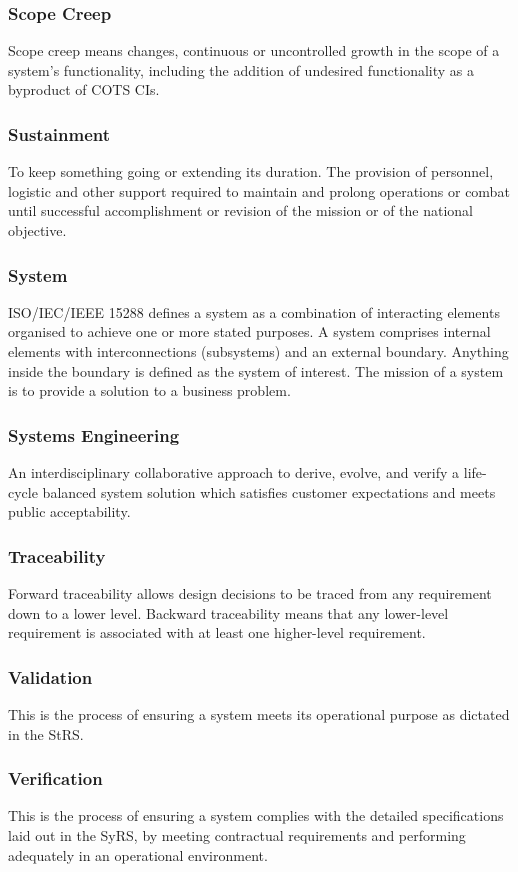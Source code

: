 \documentclass[journal]{IEEEtran}
\begin{document}
\subsubsection{Scope Creep}
Scope creep means changes, continuous or uncontrolled growth in the scope of a system's functionality, including the addition of undesired functionality as a byproduct of COTS CIs.
\subsubsection{Sustainment}
To keep something going or extending its duration. The provision of personnel, logistic and other support required to maintain and  prolong operations or combat until successful accomplishment or revision of the mission or of
the national objective.
\subsubsection{System}
ISO/IEC/IEEE 15288 defines a system as a combination of interacting elements organised to achieve one or more stated purposes. A system comprises internal elements with interconnections (subsystems) and an external boundary. Anything inside the boundary is defined as the system of interest. The mission of a system is to provide a solution to a business problem.
\subsubsection{Systems Engineering}
An interdisciplinary collaborative approach to derive, evolve, and verify a life-cycle balanced system solution which satisfies customer expectations and meets public acceptability.
\subsubsection{Traceability}
Forward	traceability	allows design decisions to be	traced from any requirement down	to a	lower level. Backward	 traceability means that any lower-level requirement is associated with at least one higher-level requirement.
\subsubsection{Validation}
This is the process of ensuring a system meets its operational purpose as dictated in the StRS.
\subsubsection{Verification}
This is the process of ensuring a system complies with the detailed specifications laid out in the SyRS, by meeting contractual requirements and performing adequately in an operational environment.
\end{document}
